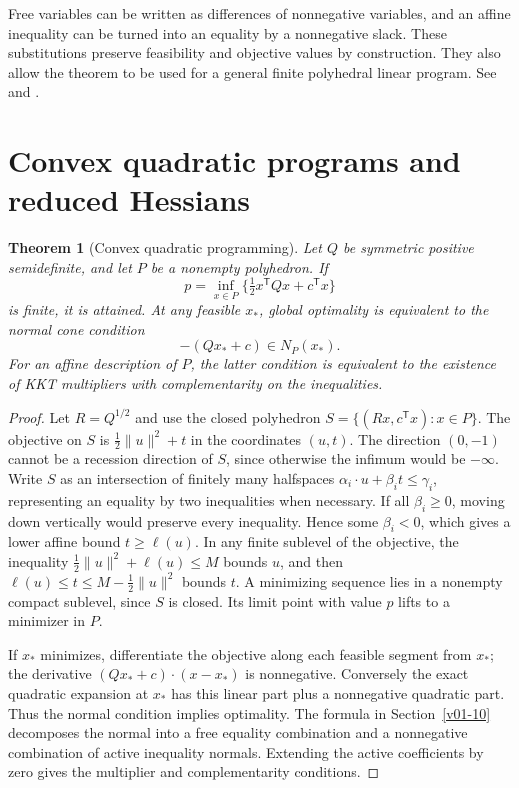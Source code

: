 \documentclass[11pt,oneside,openany]{book}
\theoremstyle{plain}
\newtheorem{theorem}{Theorem}[chapter]
\theoremstyle{definition}
\theoremstyle{remark}
\begin{document}
Free variables can be written as differences of
nonnegative variables, and an affine inequality can be
turned into an equality by a nonnegative slack.
These substitutions preserve feasibility and objective
values by construction. They also allow the theorem to
be used for a general finite polyhedral linear program.
See \cite[Theorem 13.1]{NocedalWright} and
\cite[Section 4.3]{Boyd}.

\section{Convex quadratic programs and reduced Hessians}
\label{v05-02}

\begin{theorem}[Convex quadratic programming]\label{thm:convex-qp}
Let \(Q\) be symmetric positive semidefinite, and let \(P\)
be a nonempty polyhedron. If
\[
 p=\inf_{x\in P}\{\tfrac12 x^{\mathsf T}Qx+c^{\mathsf T}x\}
\]
is finite, it is attained. At any feasible \(x_*\), global
optimality is equivalent to the normal cone condition
\[
 -(Qx_*+c)\in N_P(x_*).
\]
For an affine description of \(P\), the latter condition is
equivalent to the existence of KKT multipliers with
complementarity on the inequalities.
\end{theorem}

\begin{proof}
Let \(R=Q^{1/2}\) and use the closed polyhedron
\(S=\{(Rx,c^{\mathsf T}x):x\in P\}\).
The objective on \(S\) is \(\tfrac12\|u\|^2+t\)
in the coordinates \((u,t)\).
The direction \((0,-1)\) cannot be a recession direction
of \(S\), since otherwise the infimum would be \(-\infty\).
Write \(S\) as an intersection of finitely many halfspaces
\(\alpha_i\cdot u+\beta_i t\le \gamma_i\), representing
an equality by two inequalities when necessary.
If all \(\beta_i\ge0\), moving down vertically would
preserve every inequality. Hence some \(\beta_i<0\),
which gives a lower affine bound \(t\ge \ell(u)\).
In any finite sublevel of the objective, the inequality
\(\tfrac12\|u\|^2+\ell(u)\le M\) bounds \(u\),
and then \(\ell(u)\le t\le M-\tfrac12\|u\|^2\)
bounds \(t\). A minimizing sequence lies in a nonempty
compact sublevel, since \(S\) is closed. Its limit point
with value \(p\) lifts to a minimizer in \(P\).

If \(x_*\) minimizes, differentiate the objective along
each feasible segment from \(x_*\); the derivative
\((Qx_*+c)\cdot(x-x_*)\) is nonnegative.
Conversely the exact quadratic expansion at \(x_*\)
has this linear part plus a nonnegative quadratic
part. Thus the normal condition implies optimality.
The formula in Section~\ref{v01-10} decomposes the
normal into a free equality combination and a
nonnegative combination of active inequality
normals. Extending the active coefficients by zero
gives the multiplier and complementarity conditions.
\end{proof}
\end{document}
